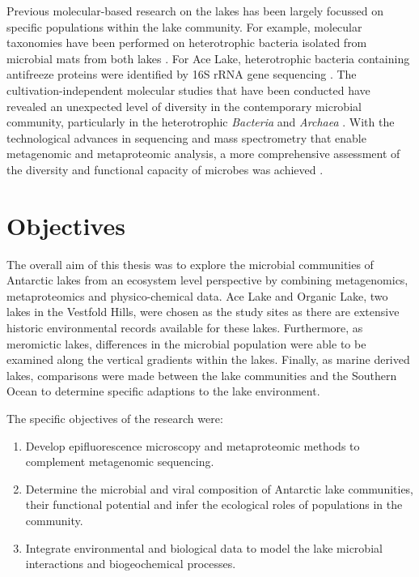 Previous molecular-based research on the lakes has been largely focussed on specific populations within the lake community.
For example, molecular taxonomies have been performed on heterotrophic bacteria isolated from microbial mats from both lakes \cite{VanTrappen2002}.
For Ace Lake, heterotrophic bacteria containing antifreeze proteins were identified by 16S \ac{rRNA} gene sequencing \cite{Gilbert2004}.
The cultivation-independent molecular studies that have been conducted have revealed an unexpected level of diversity in the contemporary microbial community, particularly in the heterotrophic \emph{Bacteria} and \emph{Archaea} \cite{Bowman2000a, Bowman2000b, Coolen2004b, Coolen2006, Coolen2008}.
With the technological advances in sequencing and mass spectrometry that enable metagenomic and metaproteomic analysis, a more comprehensive assessment of the diversity and functional capacity of microbes was achieved \cite{Ng2010a, Lauro2011}.



\section{Objectives}
The overall aim of this thesis was to explore the microbial communities of Antarctic lakes from an ecosystem level perspective by combining metagenomics, metaproteomics and physico-chemical data.
Ace Lake and Organic Lake, two lakes in the Vestfold Hills, were chosen as the study sites as there are extensive historic environmental records available for these lakes.
Furthermore, as meromictic lakes, differences in the microbial population were able to be examined along the vertical gradients within the lakes.
Finally, as marine derived lakes, comparisons were made between the lake communities and the Southern Ocean to determine specific adaptions to the lake environment.

The specific objectives of the research were:

\begin{enumerate}
\item 
  Develop epifluorescence microscopy and metaproteomic methods to complement metagenomic sequencing.

\item
  Determine the microbial and viral composition of Antarctic lake communities, their functional potential and infer the ecological roles of populations in the community.

\item
  Integrate environmental and biological data to model the lake microbial interactions and biogeochemical processes.

\end{enumerate}

